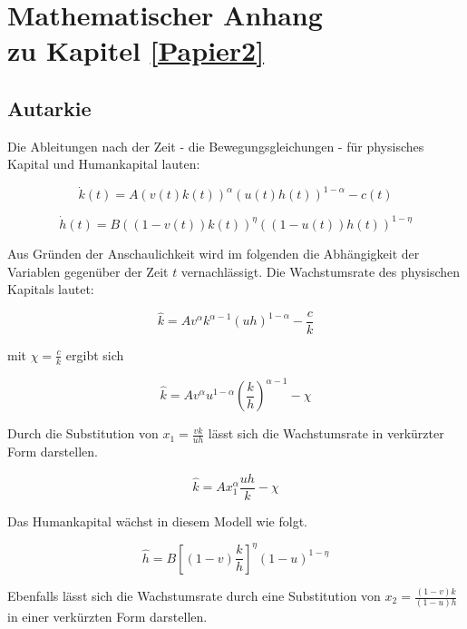 
\chapter[Mathematischer Anhang zu Kapitel \ref{Papier2}]{Mathematischer Anhang \\ zu Kapitel \ref{Papier2}}%
\section{Autarkie}\label{AutarkieAPPENDIX}


Die Ableitungen nach der Zeit - die Bewegungsgleichungen - für physisches Kapital und Humankapital lauten:


	\begin{equation}
		\dot{k}(t)=A(v(t)k(t))^\alpha(u(t)h(t))^{1-\alpha}-c(t)
	\end{equation}
	
	
	\begin{equation}
		\dot{h}(t)=B((1-v(t))k(t))^{\eta}((1-u(t))h(t))^{1-\eta}
	\end{equation}
	
	
Aus Gründen der Anschaulichkeit wird im folgenden die Abhängigkeit der Variablen gegenüber der Zeit $t$ vernachlässigt. Die Wachstumsrate des physischen Kapitals lautet: 


	\begin{equation*}
		\hat{k}=Av^\alpha k^{\alpha-1}(uh)^{1-\alpha}-\frac{c}{k}
	\end{equation*}
		
		
mit $\chi=\frac{c}{k}$ ergibt sich


	\begin{equation}
		\hat{k}=Av^\alpha u^{1-\alpha}\left(\frac{k}{h}\right)^{\alpha-1}-\chi
	\end{equation}
		
		
Durch die Substitution von $x_1=\frac{vk}{uh}$ lässt sich die Wachstumsrate in verkürzter Form darstellen. 

	
	\begin{equation}
		\boxed{\hat{k}=Ax_1^\alpha \frac{uh}{k}-\chi}
	\end{equation}


Das Humankapital wächst in diesem Modell wie folgt. 


	\begin{equation}
		\hat{h}=B\left[(1-v)\frac{k}{h}\right]^{\eta}(1-u)^{1-\eta}
	\end{equation}


Ebenfalls lässt sich die Wachstumsrate durch eine Substitution von $x_2=\frac{(1-v)k}{(1-u)h}$ in einer verkürzten Form darstellen. 


